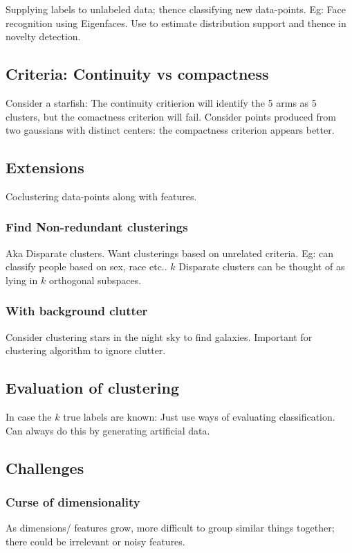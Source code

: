 \documentclass[oneside, article]{memoir}
\begin{document}
Supplying labels to unlabeled data; thence classifying new data-points. Eg: Face recognition using Eigenfaces. Use to estimate distribution support and thence in novelty detection.

\subsection{Criteria: Continuity vs compactness}
Consider a starfish: The continuity critierion will identify the 5 arms as 5 clusters, but the comactness criterion will fail. Consider points produced from two gaussians with distinct centers: the compactness criterion appears better.

\subsection{Extensions}
Coclustering data-points along with features.

\subsubsection{Find Non-redundant clusterings}
Aka Disparate clusters. Want clusterings based on unrelated criteria. Eg: can classify people based on sex, race etc.. $k$ Disparate clusters can be thought of as lying in $k$ orthogonal subspaces.

\subsubsection{With background clutter}
Consider clustering stars in the night sky to find galaxies. Important for clustering algorithm to ignore clutter.

\subsection{Evaluation of clustering}
In case the $k$ true labels are known: Just use ways of evaluating classification. Can always do this by generating artificial data.

\subsection{Challenges}
\subsubsection{Curse of dimensionality}
As dimensions/ features grow, more difficult to group similar things together; there could be irrelevant or noisy features.
\end{document}
